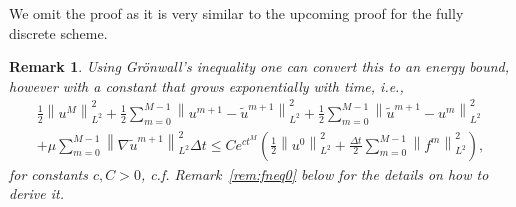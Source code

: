 \documentclass[10pt,letterpaper]{amsart}
\newcommand{\tu}{\widetilde{u}}
\newcommand\norm[1]{\left\lVert#1\right\rVert}
\newtheorem{remark}[lemma]{Remark}
\theoremstyle{definition}{\newtheorem{definition}[lemma]{Definition}}
\numberwithin{equation}{section}
\begin{document}
We omit the proof as it is very similar to the upcoming proof  for the fully discrete scheme. 
\begin{remark}
	Using Gr\"onwall's inequality one can convert this to an energy bound, however with a constant that grows exponentially with time, i.e.,
	\begin{multline}
		\label{eq:basic_semi-discrete_energy_lawgr}
		\frac{1}{2}\norm{u^{M}}^2_{L^2}+\frac{1}{2}\sum_{m=0}^{M-1}\norm{u^{m+1}-\tu^{m+1}}_{L^2}^2
			+\frac{1}{2}\sum_{m=0}^{M-1}\norm{\tu^{m+1}-u^m}_{L^2}^2 \\
			+\mu \sum_{m=0}^{M-1}\norm{\nabla\tu^{m+1}}_{L^2}^2\Delta t  \leq C e^{c t^M} 	\left(\frac{1}{2}\norm{u^{0}}^2_{L^2}+\frac{\Delta t}{2} \sum_{m=0}^{M-1}\norm{f^m}_{L^2}^2\right),
		\end{multline}
		for constants $c,C>0$, c.f. Remark~\ref{rem:fneq0} below for the details on how to derive it. 
	\end{remark}
\end{document}
